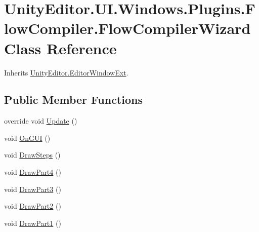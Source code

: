 \hypertarget{class_unity_editor_1_1_u_i_1_1_windows_1_1_plugins_1_1_flow_compiler_1_1_flow_compiler_wizard}{}\section{Unity\+Editor.\+U\+I.\+Windows.\+Plugins.\+Flow\+Compiler.\+Flow\+Compiler\+Wizard Class Reference}
\label{class_unity_editor_1_1_u_i_1_1_windows_1_1_plugins_1_1_flow_compiler_1_1_flow_compiler_wizard}


Inherits \hyperlink{class_unity_editor_1_1_editor_window_ext}{Unity\+Editor.\+Editor\+Window\+Ext}.

\subsection*{Public Member Functions}
\begin{DoxyCompactItemize}
\item 
override void \hyperlink{class_unity_editor_1_1_u_i_1_1_windows_1_1_plugins_1_1_flow_compiler_1_1_flow_compiler_wizard_af154f6e2cb2d5b60d2d09aab544c7454}{Update} ()
\item 
void \hyperlink{class_unity_editor_1_1_u_i_1_1_windows_1_1_plugins_1_1_flow_compiler_1_1_flow_compiler_wizard_ae08680c654b8aecc9256e4751e66b2b7}{On\+G\+U\+I} ()
\item 
void \hyperlink{class_unity_editor_1_1_u_i_1_1_windows_1_1_plugins_1_1_flow_compiler_1_1_flow_compiler_wizard_a842beabf81386fe36153bc19e1089a96}{Draw\+Steps} ()
\item 
void \hyperlink{class_unity_editor_1_1_u_i_1_1_windows_1_1_plugins_1_1_flow_compiler_1_1_flow_compiler_wizard_a9d76927506fcb014abcdde38897968c3}{Draw\+Part4} ()
\item 
void \hyperlink{class_unity_editor_1_1_u_i_1_1_windows_1_1_plugins_1_1_flow_compiler_1_1_flow_compiler_wizard_a55d2176c612c04ff0c384eb92aca2027}{Draw\+Part3} ()
\item 
void \hyperlink{class_unity_editor_1_1_u_i_1_1_windows_1_1_plugins_1_1_flow_compiler_1_1_flow_compiler_wizard_abde602fcae7d6f9adcb66842833f7de4}{Draw\+Part2} ()
\item 
void \hyperlink{class_unity_editor_1_1_u_i_1_1_windows_1_1_plugins_1_1_flow_compiler_1_1_flow_compiler_wizard_adf0bdc2454848ec79a3489e8ad248251}{Draw\+Part1} ()
\end{DoxyCompactItemize}
